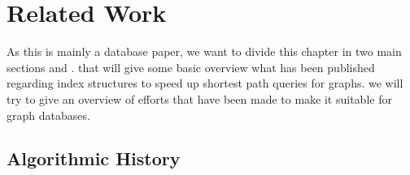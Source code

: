 \chapter{Related Work} 

As this is mainly a database paper, we want to divide this chapter in two main sections  and .  
that will give some basic overview what has been published regarding index structures to speed up shortest path queries for graphs.  we will try 
to give an overview of efforts that have been made to make \cite[Customizable Contraction Hierarchies]{CCH} it suitable for graph databases.

\section[Algorithmic History]{Algorithmic History} \label{sec:algorithmic_history}

